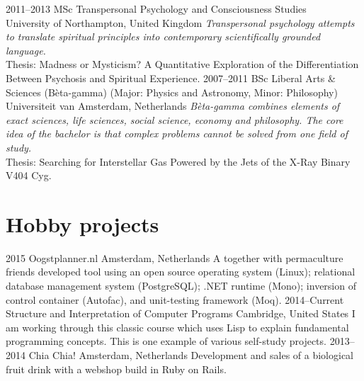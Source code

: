 \documentclass[]{friggeri-cv} %
\begin{document}
\begin{entrylist}
\entry
{2011--2013}
{MSc {\normalfont Transpersonal Psychology and Consciousness Studies}}
{\\University of Northampton, United Kingdom}
{\emph{Transpersonal psychology attempts to translate spiritual principles into contemporary \mbox{scientifically} grounded language.} 
\\ Thesis: Madness or Mysticism? A Quantitative Exploration of the Differentiation \mbox{Between} Psychosis and Spiritual Experience.}
\entry
{2007--2011}
{BSc {\normalfont Liberal Arts \& Sciences (Bèta-gamma) (Major: Physics and Astronomy, Minor: Philosophy)}}
{\\Universiteit van Amsterdam, Netherlands}
{\emph{Bèta-gamma combines elements of exact sciences, life sciences, social science, economy and philosophy. The core idea of the bachelor is that complex problems cannot be solved from one field of study. } \\
Thesis: Searching for Interstellar Gas Powered by the Jets of the X-Ray Binary V404 Cyg. }
\end{entrylist}



\section{Hobby projects}
\begin{entrylist}
\entry
{2015}
{Oogstplanner.nl}
{Amsterdam, Netherlands}
{A together with permaculture friends developed tool using an open source operating system (Linux); relational database management system (PostgreSQL); .NET runtime (Mono); inversion of control container (Autofac), and unit-testing framework (Moq).}
\entry
{2014--Current}
{Structure and Interpretation of Computer Programs}
{Cambridge, United States}
{I am working through this classic course which uses Lisp to explain fundamental \mbox{programming} concepts. This is one example of various self-study projects.}
\entry
{2013--2014}
{Chia Chia!}
{Amsterdam, Netherlands}
{Development and sales of a biological fruit drink with a webshop build in Ruby on Rails.}

\end{entrylist}
\end{document}
